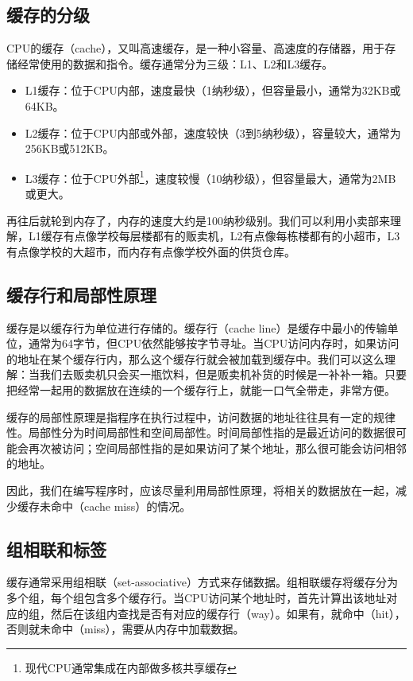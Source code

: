 \documentclass[../main.tex]{subfiles}
\begin{document}
\subsection{缓存的分级}

CPU的缓存（cache），又叫高速缓存，是一种小容量、高速度的存储器，用于存储经常使用的数据和指令。缓存通常分为三级：L1、L2和L3缓存。
\begin{itemize}
  \item L1缓存：位于CPU内部，速度最快（1纳秒级），但容量最小，通常为32KB或64KB。
  \item L2缓存：位于CPU内部或外部，速度较快（3到5纳秒级），容量较大，通常为256KB或512KB。
  \item L3缓存：位于CPU外部\footnote{现代CPU通常集成在内部做多核共享缓存}，速度较慢（10纳秒级），但容量最大，通常为2MB或更大。
\end{itemize}
再往后就轮到内存了，内存的速度大约是100纳秒级别。我们可以利用小卖部来理解，L1缓存有点像学校每层楼都有的贩卖机，L2有点像每栋楼都有的小超市，L3有点像学校的大超市，而内存有点像学校外面的供货仓库。

\subsection{缓存行和局部性原理}

缓存是以缓存行为单位进行存储的。缓存行（cache line）是缓存中最小的传输单位，通常为64字节，但CPU依然能够按字节寻址。当CPU访问内存时，如果访问的地址在某个缓存行内，那么这个缓存行就会被加载到缓存中。我们可以这么理解：当我们去贩卖机只会买一瓶饮料，但是贩卖机补货的时候是一补补一箱。只要把经常一起用的数据放在连续的一个缓存行上，就能一口气全带走，非常方便。

缓存的局部性原理是指程序在执行过程中，访问数据的地址往往具有一定的规律性。局部性分为时间局部性和空间局部性。时间局部性指的是最近访问的数据很可能会再次被访问；空间局部性指的是如果访问了某个地址，那么很可能会访问相邻的地址。

因此，我们在编写程序时，应该尽量利用局部性原理，将相关的数据放在一起，减少缓存未命中（cache miss）的情况。

\subsection{组相联和标签}

缓存通常采用组相联（set-associative）方式来存储数据。组相联缓存将缓存分为多个组，每个组包含多个缓存行。当CPU访问某个地址时，首先计算出该地址对应的组，然后在该组内查找是否有对应的缓存行（way）。如果有，就命中（hit），否则就未命中（miss），需要从内存中加载数据。
\end{document}
